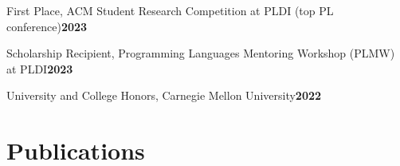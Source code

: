 \documentclass[11pt]{article} %
\begin{document}
\noindent First Place, ACM Student Research Competition at PLDI (top PL conference)\hfill\textbf{2023}\par
\noindent Scholarship Recipient, Programming Languages Mentoring Workshop (PLMW) at PLDI\hfill\textbf{2023}\par
\noindent University and College Honors, Carnegie Mellon University\hfill\textbf{2022}\par

\section{Publications}

{\small
\setlength{\bibitemsep}{1pt}
\printbibliography[heading=none]}
\end{document}
